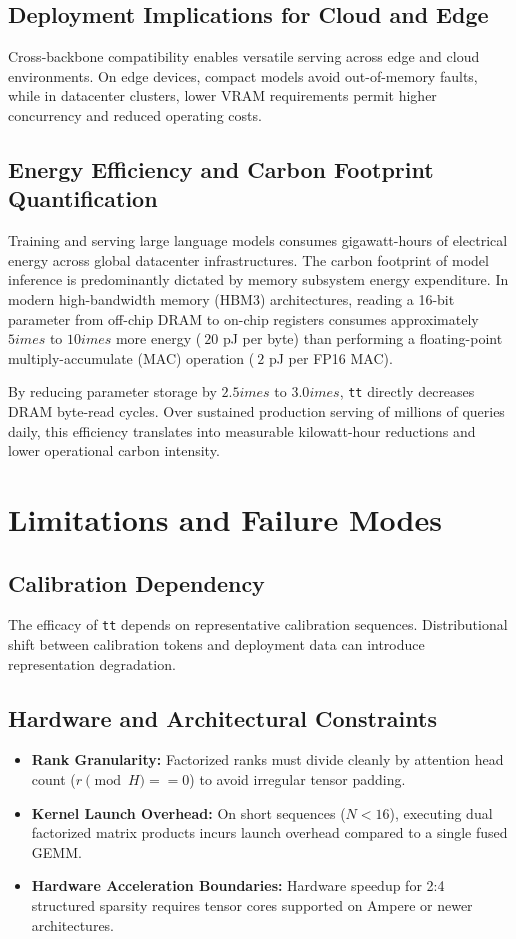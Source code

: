 \subsection{Deployment Implications for Cloud and Edge}
Cross-backbone compatibility enables versatile serving across edge and cloud environments. On edge devices, compact models avoid out-of-memory faults, while in datacenter clusters, lower VRAM requirements permit higher concurrency and reduced operating costs.

\subsection{Energy Efficiency and Carbon Footprint Quantification}
Training and serving large language models consumes gigawatt-hours of electrical energy across global datacenter infrastructures. The carbon footprint of model inference is predominantly dictated by memory subsystem energy expenditure. In modern high-bandwidth memory (HBM3) architectures, reading a 16-bit parameter from off-chip DRAM to on-chip registers consumes approximately $5	imes$ to $10	imes$ more energy ($~20$ pJ per byte) than performing a floating-point multiply-accumulate (MAC) operation ($~2$ pJ per FP16 MAC).

By reducing parameter storage by $2.5	imes$ to $3.0	imes$, \texttt{tt} directly decreases DRAM byte-read cycles. Over sustained production serving of millions of queries daily, this efficiency translates into measurable kilowatt-hour reductions and lower operational carbon intensity.


\section{Limitations and Failure Modes}

\subsection{Calibration Dependency}
The efficacy of \texttt{tt} depends on representative calibration sequences. Distributional shift between calibration tokens and deployment data can introduce representation degradation.

\subsection{Hardware and Architectural Constraints}
\begin{itemize}
\item \textbf{Rank Granularity:} Factorized ranks must divide cleanly by attention head count ($r \pmod H == 0$) to avoid irregular tensor padding.
\item \textbf{Kernel Launch Overhead:} On short sequences ($N < 16$), executing dual factorized matrix products incurs launch overhead compared to a single fused GEMM.
\item \textbf{Hardware Acceleration Boundaries:} Hardware speedup for 2:4 structured sparsity requires tensor cores supported on Ampere or newer architectures.
\end{itemize}


